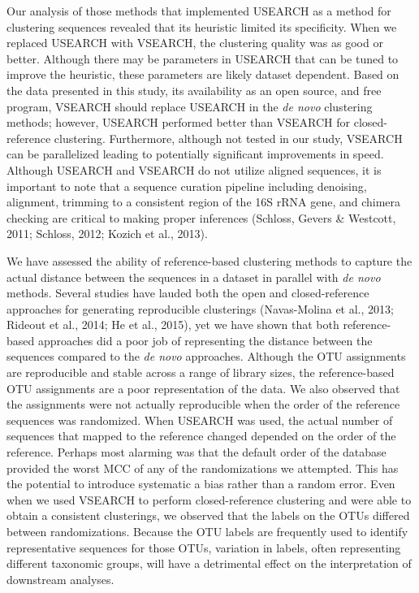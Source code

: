 \documentclass[11pt,]{article}
\begin{document}
Our analysis of those methods that implemented USEARCH as a method for
clustering sequences revealed that its heuristic limited its
specificity. When we replaced USEARCH with VSEARCH, the clustering
quality was as good or better. Although there may be parameters in
USEARCH that can be tuned to improve the heuristic, these parameters are
likely dataset dependent. Based on the data presented in this study, its
availability as an open source, and free program, VSEARCH should replace
USEARCH in the \emph{de novo} clustering methods; however, USEARCH
performed better than VSEARCH for closed-reference clustering.
Furthermore, although not tested in our study, VSEARCH can be
parallelized leading to potentially significant improvements in speed.
Although USEARCH and VSEARCH do not utilize aligned sequences, it is
important to note that a sequence curation pipeline including denoising,
alignment, trimming to a consistent region of the 16S rRNA gene, and
chimera checking are critical to making proper inferences (Schloss,
Gevers \& Westcott, 2011; Schloss, 2012; Kozich et al., 2013).

We have assessed the ability of reference-based clustering methods to
capture the actual distance between the sequences in a dataset in
parallel with \emph{de novo} methods. Several studies have lauded both
the open and closed-reference approaches for generating reproducible
clusterings (Navas-Molina et al., 2013; Rideout et al., 2014; He et al.,
2015), yet we have shown that both reference-based approaches did a poor
job of representing the distance between the sequences compared to the
\emph{de novo} approaches. Although the OTU assignments are reproducible
and stable across a range of library sizes, the reference-based OTU
assignments are a poor representation of the data. We also observed that
the assignments were not actually reproducible when the order of the
reference sequences was randomized. When USEARCH was used, the actual
number of sequences that mapped to the reference changed depended on the
order of the reference. Perhaps most alarming was that the default order
of the database provided the worst MCC of any of the randomizations we
attempted. This has the potential to introduce systematic a bias rather
than a random error. Even when we used VSEARCH to perform
closed-reference clustering and were able to obtain a consistent
clusterings, we observed that the labels on the OTUs differed between
randomizations. Because the OTU labels are frequently used to identify
representative sequences for those OTUs, variation in labels, often
representing different taxonomic groups, will have a detrimental effect
on the interpretation of downstream analyses.
\end{document}
